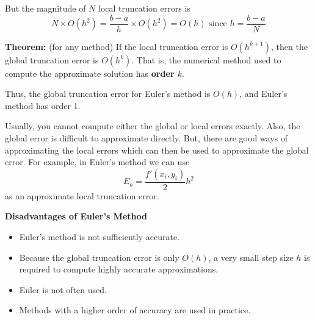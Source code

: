 \documentclass [titlepage,12pt,letter] {article}
\begin{document}
But the magnitude of $N$ local truncation errors is 
\[
N \times O(h^2)=\frac{b-a}{h} \times O(h^2) = O(h) \text{ since } h = \frac{b-a}{N}
\]

{\bf Theorem:} (for any method)
If the local truncation error is $O(h^{k+1})$, then the global truncation error is $O(h^k)$. That is, the numerical method used to compute the approximate solution has {\bf order $k$}.  

Thus, the global truncation error for Euler’s method is $O(h)$, and Euler’s method has order 1.

Usually, you cannot compute either the global or local errors exactly. Also, the global error is difficult to approximate directly. But, there are good ways of approximating the local errors which can then be used to approximate the global error. For example, in Euler's method we can use 
\[
E_a=\frac{f'(x_i,y_i)}{2}h^2
\]
as an approximate local truncation error.

{\bf Disadvantages of Euler's Method}
\begin{itemize}
\item{Euler's method is not sufficiently accurate.}
\item{Because the global truncation error is only $O(h)$, a very small step size $h$ is required to compute highly accurate approximations.}
\item{Euler is not often used.}
\item{Methods with a higher order of accuracy are used in practice.}
\end{itemize}
\end{document}
